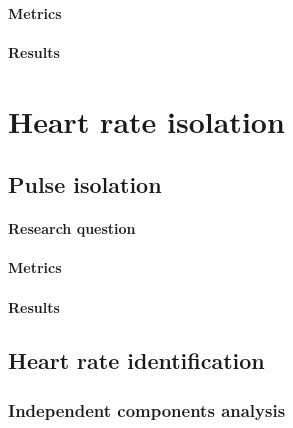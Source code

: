 \paragraph{Metrics}
\paragraph{Results}



\section{Heart rate isolation}
\subsection{Pulse isolation}
\label{section:bss}
\paragraph{Research question}
\paragraph{Metrics}
\paragraph{Results}
\subsection{Heart rate identification}
\subsubsection{Independent components analysis}
\label{section:ica_assumption}
